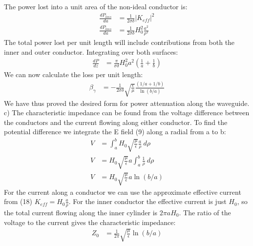 \documentclass[a4paper,11pt]{article}
\numberwithin{equation}{section}
\newcommand{\lrp}[1]{\left({#1}\right)}
\begin{document}
The power lost into a unit area of the non-ideal conductor is:
\begin{align}
 \frac{dP_{loss}}{da} &= \frac{1}{2\sigma\delta}|K_{eff}|^2\\
 \frac{dP_{loss}}{da} &= \frac{1}{2\sigma\delta}H_0^2\frac{a^2}{\rho^2}
\end{align}
The total power lost per unit length will include contributions from both the inner and outer conductor.
Integrating over both surfaces:
\begin{align}
 \frac{dP}{dz} &= \frac{\pi}{\sigma\delta}H_0^2a^2\lrp{\frac{1}{a}+\frac{1}{b}}
\end{align}
We can now calculate the loss per unit length:
\begin{align}
 \beta_\gamma &= -\frac{1}{2\sigma\delta}\sqrt{\frac{\epsilon}{\mu}}\frac{\lrp{1/a+1/b}}{\ln{(b/a)}}
\end{align}
We have thus proved the desired form for power attenuation along the waveguide.
\\
c) The characteristic impedance can be found from the voltage difference between the conductors and the current flowing along either conductor.
To find the potential difference we integrate the E field (9) along a radial from a to b:
\begin{align}
 V &= \int_a^b H_0\sqrt{\frac{\mu}{\epsilon}}\frac{a}{\rho}\ d\rho\\
 V &= H_0\sqrt{\frac{\mu}{\epsilon}}a\int_a^b \frac{1}{\rho}\ d\rho\\
 V &= H_0\sqrt{\frac{\mu}{\epsilon}}a\ln{(b/a)}
\end{align}
For the current along a conductor we can use the approximate effective current from (18) $K_{eff} = H_0\frac{a}{\rho}$.
For the inner conductor the effective current is just $H_0$, so the total current flowing along the inner cylinder is $2\pi a H_0$.
The ratio of the voltage to the current gives the characteristic impedance:
\begin{align}
 Z_0 &= \frac{1}{2\pi}\sqrt{\frac{\mu}{\epsilon}}\ln{(b/a)}
\end{align}
\end{document}
